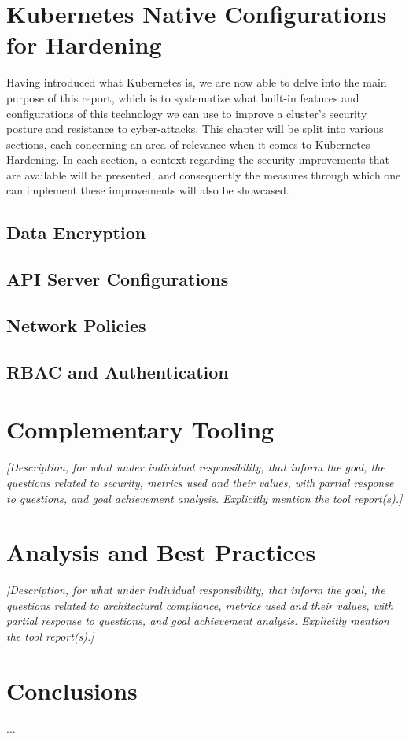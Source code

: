 \documentclass[a4paper,11pt,openright,BCOR=15mm]{scrbook}
\begin{document}
\chapter{Kubernetes Native Configurations for Hardening}
Having introduced what Kubernetes is, we are now able to delve into the main purpose of this report, which is to systematize what built-in features and configurations of this technology we can use to improve a cluster's security posture and resistance to cyber-attacks.
This chapter will be split into various sections, each concerning an area of relevance when it comes to Kubernetes Hardening. In each section, a context regarding the security improvements that are available will be presented, and consequently the measures through which one can implement these improvements will also be showcased.

	\section{Data Encryption}
	
	\section{API Server Configurations}
	
	\section{Network Policies}
	
	\section{RBAC and Authentication}
		
	\chapter{Complementary Tooling}
\textit{	[Description, for what under individual responsibility, that inform the goal, the questions related to security, metrics used and their values, with partial response to questions, and goal achievement analysis. Explicitly mention the tool report(s).]}
		
	\chapter{Analysis and Best Practices}
 \textit{	[Description, for what under individual responsibility, that inform the goal, the questions related to architectural compliance, metrics used and their values, with partial response to questions, and goal achievement analysis. Explicitly mention the tool report(s).]}
	


	\chapter{Conclusions }
 ...\newline



	
	
	\renewcommand\bibname{References}
	
	\label{references}
	
\end{document}
